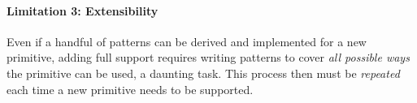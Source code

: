 \paragraph{Limitation 3: Extensibility}
Even if a handful of patterns can be
  derived and implemented for a new primitive,
  adding full support requires writing patterns 
  to cover \textit{all possible ways} the primitive can be used, a daunting task.
This process then must be \textit{repeated}
  each time a new primitive needs to be supported.
